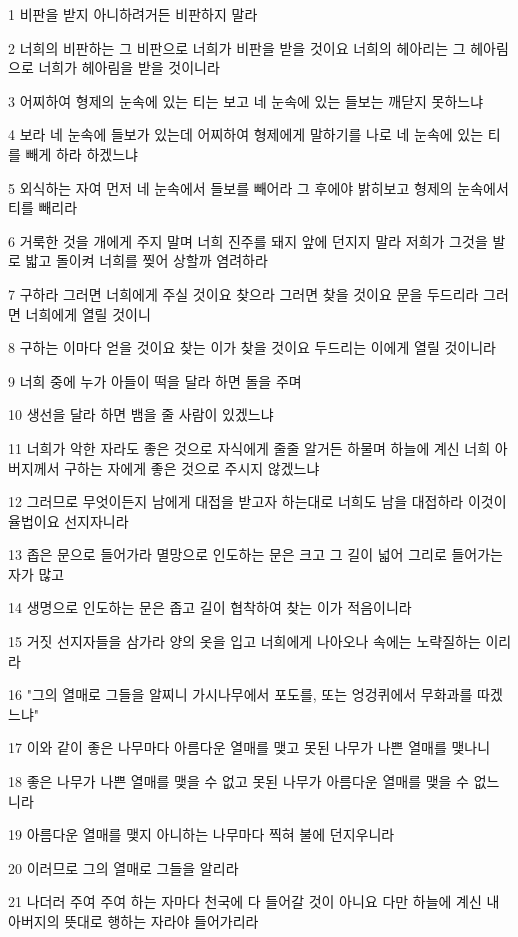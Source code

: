 \par 1 비판을 받지 아니하려거든 비판하지 말라
\par 2 너희의 비판하는 그 비판으로 너희가 비판을 받을 것이요 너희의 헤아리는 그 헤아림으로 너희가 헤아림을 받을 것이니라
\par 3 어찌하여 형제의 눈속에 있는 티는 보고 네 눈속에 있는 들보는 깨닫지 못하느냐
\par 4 보라 네 눈속에 들보가 있는데 어찌하여 형제에게 말하기를 나로 네 눈속에 있는 티를 빼게 하라 하겠느냐
\par 5 외식하는 자여 먼저 네 눈속에서 들보를 빼어라 그 후에야 밝히보고 형제의 눈속에서 티를 빼리라
\par 6 거룩한 것을 개에게 주지 말며 너희 진주를 돼지 앞에 던지지 말라 저희가 그것을 발로 밟고 돌이켜 너희를 찢어 상할까 염려하라
\par 7 구하라 그러면 너희에게 주실 것이요 찾으라 그러면 찾을 것이요 문을 두드리라 그러면 너희에게 열릴 것이니
\par 8 구하는 이마다 얻을 것이요 찾는 이가 찾을 것이요 두드리는 이에게 열릴 것이니라
\par 9 너희 중에 누가 아들이 떡을 달라 하면 돌을 주며
\par 10 생선을 달라 하면 뱀을 줄 사람이 있겠느냐
\par 11 너희가 악한 자라도 좋은 것으로 자식에게 줄줄 알거든 하물며 하늘에 계신 너희 아버지께서 구하는 자에게 좋은 것으로 주시지 않겠느냐
\par 12 그러므로 무엇이든지 남에게 대접을 받고자 하는대로 너희도 남을 대접하라 이것이 율법이요 선지자니라
\par 13 좁은 문으로 들어가라 멸망으로 인도하는 문은 크고 그 길이 넓어 그리로 들어가는 자가 많고
\par 14 생명으로 인도하는 문은 좁고 길이 협착하여 찾는 이가 적음이니라
\par 15 거짓 선지자들을 삼가라 양의 옷을 입고 너희에게 나아오나 속에는 노략질하는 이리라
\par 16 "그의 열매로 그들을 알찌니 가시나무에서 포도를, 또는 엉겅퀴에서 무화과를 따겠느냐"
\par 17 이와 같이 좋은 나무마다 아름다운 열매를 맺고 못된 나무가 나쁜 열매를 맺나니
\par 18 좋은 나무가 나쁜 열매를 맺을 수 없고 못된 나무가 아름다운 열매를 맺을 수 없느니라
\par 19 아름다운 열매를 맺지 아니하는 나무마다 찍혀 불에 던지우니라
\par 20 이러므로 그의 열매로 그들을 알리라
\par 21 나더러 주여 주여 하는 자마다 천국에 다 들어갈 것이 아니요 다만 하늘에 계신 내 아버지의 뜻대로 행하는 자라야 들어가리라
